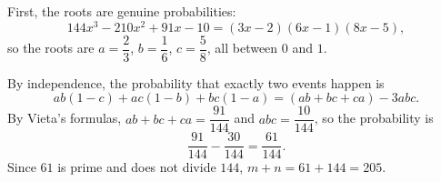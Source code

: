 First, the roots are genuine probabilities:
\[144x^3-210x^2+91x-10=(3x-2)(6x-1)(8x-5),\]
so the roots are $a=\dfrac23$, $b=\dfrac16$, $c=\dfrac58$, all between $0$ and $1$.

By independence, the probability that exactly two events happen is
\[ab(1-c)+ac(1-b)+bc(1-a)=(ab+bc+ca)-3abc.\]
By Vieta's formulas, $ab+bc+ca=\dfrac{91}{144}$ and $abc=\dfrac{10}{144}$, so the probability is
\[\dfrac{91}{144}-\dfrac{30}{144}=\dfrac{61}{144}.\]
Since $61$ is prime and does not divide $144$, $m+n=61+144=\boxed{205}$.
